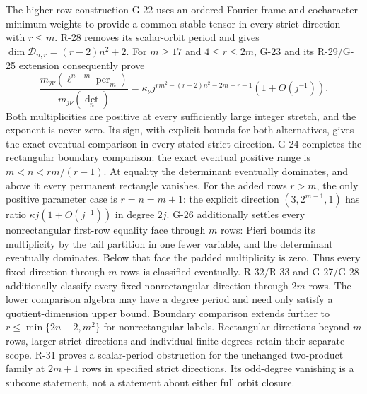 The higher-row construction G-22 uses an ordered Fourier frame and
cocharacter minimum weights to provide a common stable tensor in
every strict direction with $r\le m$. R-28 removes its scalar-orbit
period and gives $\dim\mathcal D_{n,r}=(r-2)n^2+2$.
For $m\ge17$ and $4\le r\le2m$, G-23 and its R-29/G-25 extension consequently prove
\[
 \frac{m_{j\nu}(\ell^{n-m}\operatorname{per}_m)}
      {m_{j\nu}(\det_n)}
 =\kappa_\nu j^{rm^2-(r-2)n^2-2m+r-1}(1+O(j^{-1})).
\]
Both multiplicities are positive at every sufficiently large integer
stretch, and the exponent is never zero. Its sign, with explicit
bounds for both alternatives, gives the exact eventual comparison
in every stated strict direction. G-24 completes the rectangular boundary comparison: the exact eventual positive range is $m<n<rm/(r-1)$. At equality the determinant eventually dominates, and above it every permanent rectangle vanishes. For the added rows $r>m$, the only positive parameter case is $r=n=m+1$: the explicit direction $(3,2^{m-1},1)$ has ratio $\kappa j(1+O(j^{-1}))$ in degree $2j$. G-26 additionally settles every nonrectangular first-row equality face through $m$ rows: Pieri bounds its multiplicity by the tail partition in one fewer variable, and the determinant eventually dominates. Below that face the padded multiplicity is zero. Thus every fixed direction through $m$ rows is classified eventually. R-32/R-33 and G-27/G-28 additionally classify every fixed nonrectangular direction through $2m$ rows. The lower comparison algebra may have a degree period and need only satisfy a quotient-dimension upper bound. Boundary comparison extends further to $r\le\min\{2n-2,m^2\}$ for nonrectangular labels. Rectangular directions beyond $m$ rows, larger strict directions and individual finite degrees retain their separate scope. R-31 proves a scalar-period obstruction for the unchanged two-product family at $2m+1$ rows in specified strict directions. Its odd-degree vanishing is a subcone statement, not a statement about either full orbit closure.


